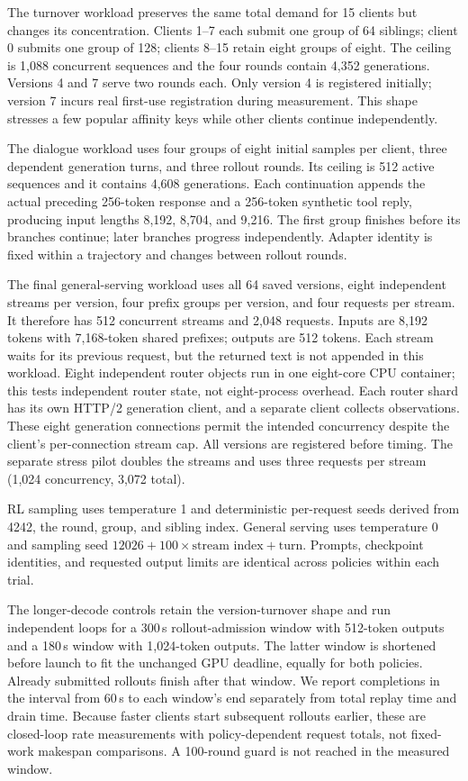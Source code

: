 The turnover workload preserves the same total demand for 15 clients but
changes its concentration. Clients 1--7 each submit one group of 64 siblings;
client 0 submits one group of 128; clients 8--15 retain eight groups of eight.
The ceiling is 1,088 concurrent sequences and the four rounds contain 4,352
generations. Versions 4 and 7 serve two rounds each. Only version 4 is registered
initially; version 7 incurs real first-use registration during measurement.
This shape stresses a few popular affinity keys while other clients continue
independently.

The dialogue workload uses four groups of eight initial samples per client,
three dependent generation turns, and three rollout rounds. Its ceiling is
512 active sequences and it contains 4,608 generations. Each continuation
appends the actual preceding 256-token response and a 256-token synthetic tool
reply, producing input lengths 8,192, 8,704, and 9,216. The first group finishes
before its branches continue; later branches progress independently. Adapter
identity is fixed within a trajectory and changes between rollout rounds.

The final general-serving workload uses all 64 saved versions, eight independent
streams per version, four prefix groups per version, and four requests per
stream. It therefore has 512 concurrent streams and 2,048 requests. Inputs are
8,192 tokens with 7,168-token shared prefixes; outputs are 512 tokens. Each
stream waits for its previous request, but the returned text is not appended in
this workload. Eight independent router objects run in one eight-core CPU
container; this tests independent router state, not eight-process overhead.
Each router shard has its own HTTP/2 generation client, and a separate client
collects observations. These eight generation connections permit the intended
concurrency despite the client's per-connection stream cap.
All versions are registered before timing. The separate stress pilot doubles
the streams and uses three requests per stream (1,024 concurrency, 3,072 total).

RL sampling uses temperature 1 and deterministic per-request seeds derived from
4242, the round, group, and sibling index. General serving uses temperature 0
and sampling seed $12026+100\times\text{stream index}+\text{turn}$.
Prompts, checkpoint identities, and requested output limits are
identical across policies within each trial.

The longer-decode controls retain the version-turnover shape and run independent
loops for a 300\,s rollout-admission window with 512-token outputs and a 180\,s
window with 1,024-token outputs. The latter window is shortened before launch
to fit the unchanged GPU deadline, equally for both policies.
Already submitted rollouts finish after that window. We report completions in
the interval from 60\,s to each window's end separately from total replay time
and drain time.
Because faster clients start subsequent rollouts earlier, these are closed-loop
rate measurements with policy-dependent request totals, not fixed-work makespan
comparisons. A 100-round guard is not reached in the measured window.

